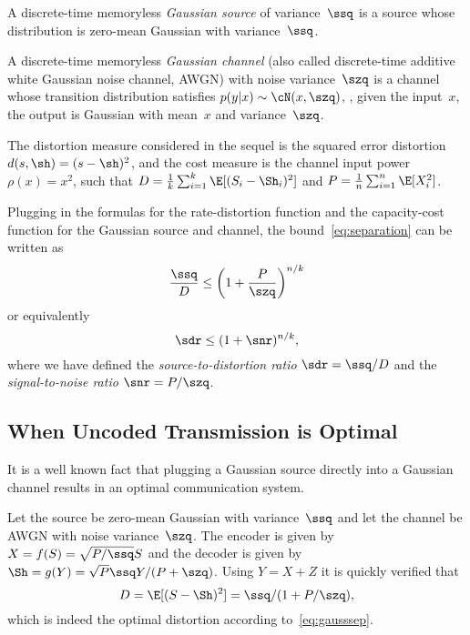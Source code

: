 \begin{definition}
  \label{def:gaussiansc}
  A discrete-time memoryless \emph{Gaussian source} of variance~$\ssq$ is a
  source whose distribution is zero-mean Gaussian with variance~$\ssq$.

  A discrete-time memoryless \emph{Gaussian channel} (also called discrete-time
  additive white Gaussian noise channel, AWGN) with noise variance~$\szq$ is a
  channel whose transition distribution satisfies $p(y|x) \sim \cN(x, \szq)$,
  \ie, given the input~$x$, the output is Gaussian with mean~$x$ and
  variance~$\szq$.
\end{definition}

The distortion measure considered in the sequel is the squared error distortion
$d(s,\sh) = (s - \sh)^2$, and the cost measure is the channel input power
$\rho(x) = x^2$, such that $D = \frac1k \sum_{i=1}^k \E[(S_i - \Sh_i)^2]$ and $P
= \frac1n \sum_{i=1}^n \E[X_i^2]$.

Plugging in the formulas for the rate-distortion function and the capacity-cost
function for the Gaussian source and channel, the bound~\eqref{eq:separation}
can be written as
\begin{equation}
  \label{eq:gausssep}
  \frac{\ssq}{D} \le \left( 1 + \frac{P}{\szq} \right)^{n/k}
\end{equation}
or equivalently
\begin{equation}
  \label{eq:gausssepsdr}
  \sdr \le (1 + \snr)^{n/k},
\end{equation}
where we have defined the \emph{source-to-distortion ratio} $\sdr = \ssq/D$ and
the \emph{signal-to-noise ratio} $\snr = P/\szq$. 


\subsection{When Uncoded Transmission is Optimal}

It is a well known fact that plugging a Gaussian source directly into a Gaussian
channel results in an optimal communication system.

\begin{example}
  \label{ex:gausssingle}
  Let the source be zero-mean Gaussian with variance~$\ssq$ and let the channel
  be AWGN with noise variance~$\szq$. The encoder is given by $X = f(S) =
  \sqrt{P/\ssq} S$ and the decoder is given by $\Sh = g(Y) = \sqrt{P} \ssq Y /
  (P + \szq)$. Using $Y = X + Z$ it is quickly verified that 
  \begin{equation*}
    D = \E[(S - \Sh)^2] = \ssq / (1 + P/\szq),
  \end{equation*}
  which is indeed the optimal distortion according to~\eqref{eq:gausssep}.
\end{example}

